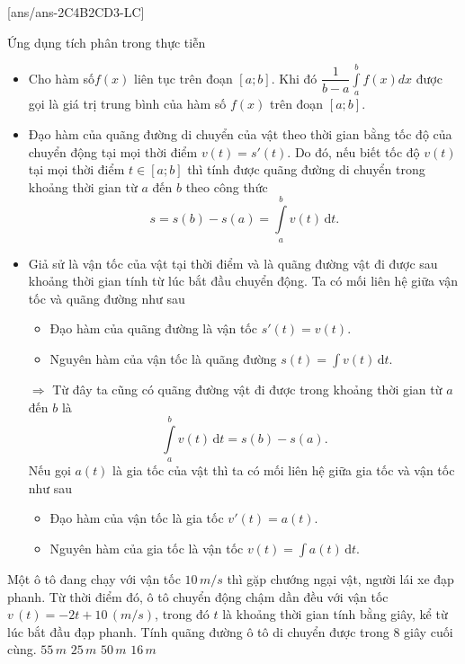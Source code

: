 [ans/ans-2C4B2CD3-LC]
\begin{dang}{Ứng dụng tích phân trong thực tiễn}
    \begin{itemize}
        \item Cho hàm số$f\left(x \right)$ liên tục trên đoạn $\left[a;b \right]$. Khi đó $\dfrac{1}{b-a}\displaystyle\int\limits_a^b{f\left(x \right)dx}$ được gọi là giá trị trung bình của hàm số $f\left(x \right)$ trên đoạn $\left[a;b \right]$.
        \item Đạo hàm của quãng đường di chuyển của vật theo thời gian bằng tốc độ của chuyển động tại mọi thời điểm $v(t)=s'(t)$. Do đó, nếu biết tốc độ $v(t)$ tại mọi thời điểm $t\in \left[a;b \right]$ thì tính được quãng đường di chuyển trong khoảng thời gian từ $a$ đến $b$ theo công thức
        $$s=s\left(b \right)-s\left(a \right)=\displaystyle\int\limits_a^b v(t)\mathrm{\,d}t.$$
        \item Giả sử là vận tốc của vật tại thời điểm và là quãng đường vật đi được sau khoảng thời gian tính từ lúc bắt đầu chuyển động. Ta có mối liên hệ giữa vận tốc và quãng đường như sau
        \begin{itemize}
            \item Đạo hàm của quãng đường là vận tốc $s'(t)=v(t)$.
            \item Nguyên hàm của vận tốc là quãng đường $s(t)= \displaystyle\int v(t)\mathrm{\,d}t$.
        \end{itemize}
        $\Rightarrow$ Từ đây ta cũng có quãng đường vật đi được trong khoảng thời gian từ $a$ đến $b$ là 
        $$\displaystyle\int\limits_a^b v(t)\mathrm{\,d}t=s(b)-s(a).$$ 
        Nếu gọi $a(t)$ là gia tốc của vật thì ta có mối liên hệ giữa gia tốc và vận tốc như sau
        \begin{itemize}
            \item Đạo hàm của vận tốc là gia tốc $v'(t)=a(t)$.
            \item Nguyên hàm của gia tốc là vận tốc $v(t)= \displaystyle\int a(t)\mathrm{\,d}t$.
        \end{itemize}
    \end{itemize}
\end{dang}
\TN
\begin{ex}%
    Một ô tô đang chạy với vận tốc $10\,m/s$ thì gặp chướng ngại vật, người lái xe đạp phanh. Từ thời điểm đó, ô tô chuyển động chậm dần đều với vận tốc $v\,\left(t \right)=-2t+10\,\left(m/s \right)$, trong đó $t$ là khoảng thời gian tính bằng giây, kể từ lúc bắt đầu đạp phanh. Tính quãng đường ô tô di chuyển được trong $8$ giây cuối cùng.
    \choice
    {\True $55\,m$}
    {$25\,m$}
    {$50\,m$}
    {$16\,m$}
\end{ex}

